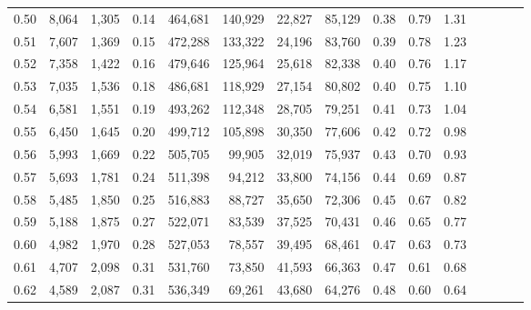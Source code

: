 \begin{tabular}{rrrcrrrrrrrrrrr}
0.50 &   8,064 &  1,305 &                                       0.14 &  464,681 &  140,929 &   22,827 &   85,129 &  0.38 &  0.79 &                         1.31 \\
0.51 &   7,607 &  1,369 &                                       0.15 &  472,288 &  133,322 &   24,196 &   83,760 &  0.39 &  0.78 &                         1.23 \\
0.52 &   7,358 &  1,422 &                                       0.16 &  479,646 &  125,964 &   25,618 &   82,338 &  0.40 &  0.76 &                         1.17 \\
0.53 &   7,035 &  1,536 &                                       0.18 &  486,681 &  118,929 &   27,154 &   80,802 &  0.40 &  0.75 &                         1.10 \\
0.54 &   6,581 &  1,551 &                                       0.19 &  493,262 &  112,348 &   28,705 &   79,251 &  0.41 &  0.73 &                         1.04 \\
0.55 &   6,450 &  1,645 &                                       0.20 &  499,712 &  105,898 &   30,350 &   77,606 &  0.42 &  0.72 &                         0.98 \\
0.56 &   5,993 &  1,669 &                                       0.22 &  505,705 &   99,905 &   32,019 &   75,937 &  0.43 &  0.70 &                         0.93 \\
0.57 &   5,693 &  1,781 &                                       0.24 &  511,398 &   94,212 &   33,800 &   74,156 &  0.44 &  0.69 &                         0.87 \\
0.58 &   5,485 &  1,850 &                                       0.25 &  516,883 &   88,727 &   35,650 &   72,306 &  0.45 &  0.67 &                         0.82 \\
0.59 &   5,188 &  1,875 &                                       0.27 &  522,071 &   83,539 &   37,525 &   70,431 &  0.46 &  0.65 &                         0.77 \\
0.60 &   4,982 &  1,970 &                                       0.28 &  527,053 &   78,557 &   39,495 &   68,461 &  0.47 &  0.63 &                         0.73 \\
0.61 &   4,707 &  2,098 &                                       0.31 &  531,760 &   73,850 &   41,593 &   66,363 &  0.47 &  0.61 &                         0.68 \\
0.62 &   4,589 &  2,087 &                                       0.31 &  536,349 &   69,261 &   43,680 &   64,276 &  0.48 &  0.60 &                         0.64 \\

\end{tabular}
